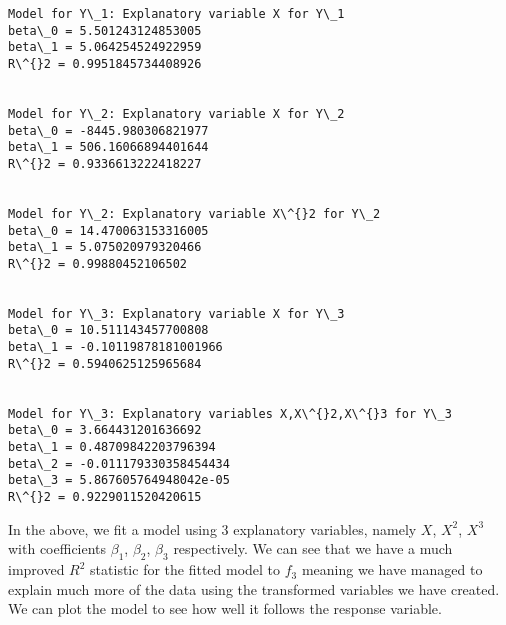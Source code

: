 \documentclass[11pt]{article}
\begin{document}
    \begin{Verbatim}[commandchars=\\\{\}]
Model for Y\_1: Explanatory variable X for Y\_1
beta\_0 = 5.501243124853005
beta\_1 = 5.064254524922959
R\^{}2 = 0.9951845734408926


Model for Y\_2: Explanatory variable X for Y\_2
beta\_0 = -8445.980306821977
beta\_1 = 506.16066894401644
R\^{}2 = 0.9336613222418227


Model for Y\_2: Explanatory variable X\^{}2 for Y\_2
beta\_0 = 14.470063153316005
beta\_1 = 5.075020979320466
R\^{}2 = 0.99880452106502


Model for Y\_3: Explanatory variable X for Y\_3
beta\_0 = 10.511143457700808
beta\_1 = -0.10119878181001966
R\^{}2 = 0.5940625125965684


Model for Y\_3: Explanatory variables X,X\^{}2,X\^{}3 for Y\_3
beta\_0 = 3.664431201636692
beta\_1 = 0.48709842203796394
beta\_2 = -0.011179330358454434
beta\_3 = 5.867605764948042e-05
R\^{}2 = 0.9229011520420615

    \end{Verbatim}

    In the above, we fit a model using 3 explanatory variables, namely
\(X\), \(X^2\), \(X^3\) with coefficients \(\beta_1\), \(\beta_2\),
\(\beta_3\) respectively. We can see that we have a much improved
\(R^2\) statistic for the fitted model to \(f_3\) meaning we have
managed to explain much more of the data using the transformed variables
we have created. We can plot the model to see how well it follows the
response variable.
\end{document}
